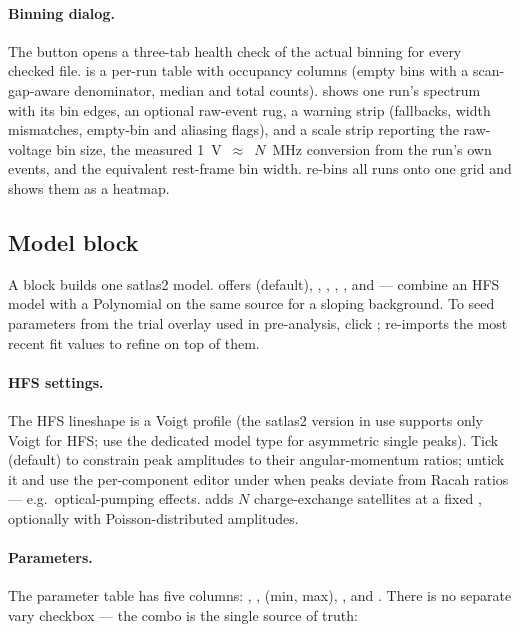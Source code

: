\paragraph{Binning dialog.}
The  button opens a three-tab health check of the actual
binning for every checked file.  is a per-run table with
occupancy columns (empty bins with a scan-gap-aware denominator,
median and total counts).  shows one run's spectrum
with its bin edges, an optional raw-event rug, a warning strip
(fallbacks, width mismatches, empty-bin and aliasing flags), and a
scale strip reporting the raw-voltage bin size, the measured
1~V~$\approx$~$N$~MHz conversion from the run's own events, and the
equivalent rest-frame bin width.  re-bins all runs onto
one grid and shows them as a heatmap.

\subsection{Model block}

A  block builds one satlas2 model.  offers
 (default), , ,
, , and
 --- combine an HFS model with a Polynomial on the
same source for a sloping background. To seed parameters from the
trial overlay used in pre-analysis, click
;  re-imports
the most recent fit values to refine on top of them.

\paragraph{HFS settings.}
The HFS lineshape is a Voigt profile (the satlas2 version in use
supports only Voigt for HFS; use the dedicated 
model type for asymmetric single peaks). Tick  (default)
to constrain peak amplitudes to their angular-momentum ratios;
untick it and use the per-component editor under
 when peaks deviate from Racah ratios ---
e.g.\ optical-pumping effects.  adds $N$
charge-exchange satellites at a fixed , optionally with
Poisson-distributed amplitudes.

\paragraph{Parameters.}
The parameter table has five columns: , ,
 (min, max), , and . There is
no separate vary checkbox --- the  combo is the single
source of truth:

